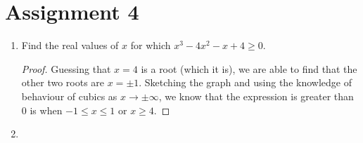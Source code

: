 \documentclass[10pt]{article}
\theoremstyle{definition}
\theoremstyle{remark}
\begin{document}
\section*{Assignment 4}

\begin{enumerate}[label=(\roman*)]
    \item Find the real values of $x$ for which $x^3 - 4x^2 - x + 4 \geq 0$.
        \begin{proof}
            Guessing that $x = 4$ is a root (which it is), we are able to find that
            the other two roots are $x = \pm 1$. Sketching the graph and using the knowledge 
            of behaviour of cubics as $x \to \pm \infty$, we know that the expression 
            is greater than $0$ is when $-1 \leq x \leq 1$ or $x \geq 4$. 
        \end{proof}
    \item 
\end{enumerate}
\end{document}
